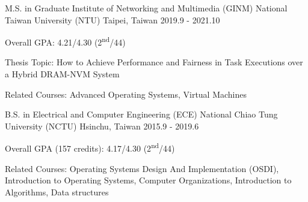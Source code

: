 

\begin{cventries}

  \cventry
    {M.S. in Graduate Institute of Networking and Multimedia (GINM)} %
    {National Taiwan University (NTU)} %
    {Taipei, Taiwan} %
    {2019.9 - 2021.10} %
    {
      \begin{cvitems} %
        \item {Overall GPA: 4.21/4.30 (2\textsuperscript{nd}/44)}
        \item {Thesis Topic: How to Achieve Performance and Fairness in Task Executions over a Hybrid DRAM-NVM System}
        \item {Related Courses: Advanced Operating Systems, Virtual Machines}
      \end{cvitems}
    }
    
  \cventry
    {B.S. in Electrical and Computer Engineering (ECE)} %
    {National Chiao Tung University (NCTU)} %
    {Hsinchu, Taiwan} %
    {2015.9 - 2019.6} %
    {
      \begin{cvitems} %
        \item {Overall GPA (157 credits): 4.17/4.30 (2\textsuperscript{nd}/44)}
        \item {Related Courses: Operating Systems Design And Implementation (OSDI), Introduction to Operating Systems, Computer Organizations, Introduction to Algorithms, Data structures}
      \end{cvitems}
    }

\end{cventries}
